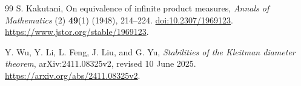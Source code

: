 \documentclass[11pt]{article}
\theoremstyle{definition}
\theoremstyle{remark}
\begin{document}
\begin{thebibliography}{99}
S. Kakutani, On equivalence of infinite product measures,
\emph{Annals of Mathematics} (2) \textbf{49}(1) (1948), 214--224.
\href{https://doi.org/10.2307/1969123}{doi:10.2307/1969123}.
\url{https://www.jstor.org/stable/1969123}.

Y. Wu, Y. Li, L. Feng, J. Liu, and G. Yu,
\emph{Stabilities of the Kleitman diameter theorem},
arXiv:2411.08325v2, revised 10 June 2025.
\url{https://arxiv.org/abs/2411.08325v2}.

\end{thebibliography}
\end{document}
